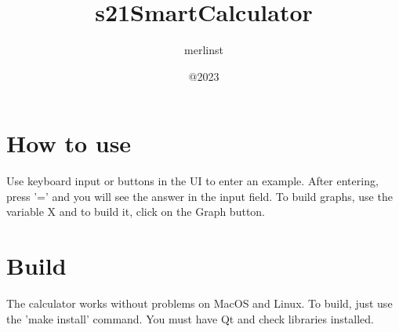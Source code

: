 \documentclass{article}
\title{s21SmartCalculator}
\author{merlinst}
\date{@2023}
\begin{document}
\maketitle

\section{How to use}
Use keyboard input or buttons in the UI to enter an example. After entering, press '=' and you will see the answer in the input field. To build graphs, use the variable X and to build it, click on the Graph button.

\section{Build}
The calculator works without problems on MacOS and Linux. To build, just use the 'make install' command. You must have Qt and check libraries installed.
\end{document}
